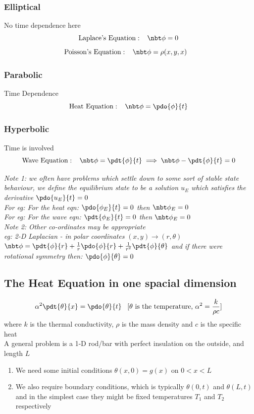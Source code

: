 \documentclass[11pt]{article}
\theoremstyle{definition}
\begin{document}
\subsubsection{Elliptical}
No time dependence here
$$\text{Laplace's Equation}:\;\;\; \nbt \phi = 0  $$
$$\text{Poisson's Equation}:\;\;\; \nbt \phi = \rho(x,y,x)  \;\;\; $$
\subsubsection{Parabolic}
Time Dependence
$$\text{Heat Equation}:\;\;\; \nbt \phi = \pdo{\phi}{t}$$
\subsubsection{Hyperbolic}
Time is involved
$$\text{Wave Equation}:\;\;\; \nbt \phi = \pdt{\phi}{t} \implies \nbt \phi - \pdt{\phi}{t} = 0$$

\textit{Note 1: we often have problems which settle down to some sort of stable state behaviour, we define the equilibrium state to be a solution $u_E$ which satisfies the derivative $\pdo{u_E}{t} = 0$\\
For eg: For the heat eqn:
$\pdo{\phi_E}{t} = 0$ then $\nbt \phi_E = 0$\\
For eg: For the wave eqn:\vspace{5mm}
$\pdt{\phi_E}{t} = 0$ then $\nbt \phi_E = 0$}\\

\textit{Note 2: Other co-ordinates may be appropriate\\
eg: 2-D Laplacian - in polar coordinates $(x,y) \rightarrow (r, \theta)$\\
$\nbt \phi = \pdt{\phi}{r} + \frac{1}{r} \pdo{\phi}{r} + \frac{1}{r^2} \pdt{\phi}{\theta}$ and if there were rotational symmetry then: $\pdo{\phi}{\theta} = 0$}

\newpage
\subsection{The Heat Equation in one spacial dimension}

$$ \alpha^2 \pdt{\theta}{x} = \pdo{\theta}{t} \;\;\; [\theta \text{ is the temperature, } \alpha^2 = \frac{k}{\rho c}]$$
where $k$ is the thermal conductivity, $\rho$ is the mass density and $c$ is the specific heat\\
A general problem is a 1-D rod/bar with perfect insulation on the outside, and length $L$
\begin{enumerate}[topsep=0pt]
    \item We need some initial conditions $\theta(x, 0) = g(x)$ on $0 < x < L$
    \item We also require boundary conditions, which is typically $\theta(0,t)$ and $\theta(L,t)$ and in the simplest case they might be fixed temperatures $T_1$ and $T_2$ respectively
\end{enumerate}
\end{document}
